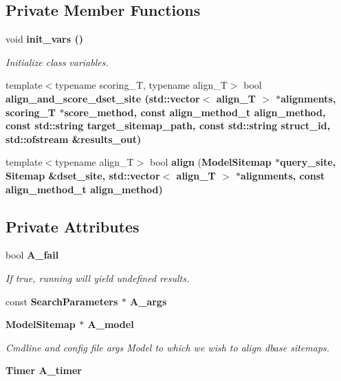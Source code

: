 \subsection*{Private Member Functions}
\begin{CompactItemize}
\item 
void \bf{init\_\-vars} ()\label{classSimSite3D_1_1Search_2249af437ccb9705517b8ad80a6a0564}

\begin{CompactList}\small\item\em Initialize class variables. \item\end{CompactList}\item 
template$<$typename scoring\_\-T, typename align\_\-T$>$ bool \bf{align\_\-and\_\-score\_\-dset\_\-site} (std::vector$<$ align\_\-T $>$ $\ast$alignments, scoring\_\-T $\ast$score\_\-method, const align\_\-method\_\-t align\_\-method, const std::string target\_\-sitemap\_\-path, const std::string struct\_\-id, std::ofstream \&results\_\-out)
\item 
template$<$typename align\_\-T$>$ bool \textbf{align} (\bf{Model\-Sitemap} $\ast$query\_\-site, \bf{Sitemap} \&dset\_\-site, std::vector$<$ align\_\-T $>$ $\ast$alignments, const align\_\-method\_\-t align\_\-method)\label{classSimSite3D_1_1Search_fab7009bb634e1f71167f883d338ba98}

\end{CompactItemize}
\subsection*{Private Attributes}
\begin{CompactItemize}
\item 
bool \bf{A\_\-fail}\label{classSimSite3D_1_1Search_658d52e28d45179d6b9d1d6a205215ea}

\begin{CompactList}\small\item\em If true, running will yield undefined results. \item\end{CompactList}\item 
const \bf{Search\-Parameters} $\ast$ \textbf{A\_\-args}\label{classSimSite3D_1_1Search_da2546891b0401510843373abd2dafb1}

\item 
\bf{Model\-Sitemap} $\ast$ \bf{A\_\-model}\label{classSimSite3D_1_1Search_7b57373932f92cce7ab4bf5148851ede}

\begin{CompactList}\small\item\em Cmdline and config file args Model to which we wish to align dbase sitemaps. \item\end{CompactList}\item 
\bf{Timer} \textbf{A\_\-timer}\label{classSimSite3D_1_1Search_55335360d173f7c5c6bc04855f62bc04}

\end{CompactItemize}
